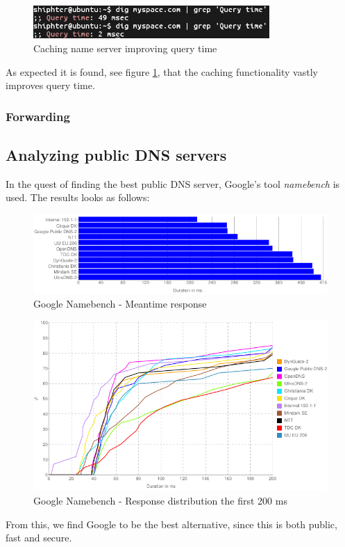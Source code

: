 \begin{figure}[ht!]
\centering
\includegraphics[width=90mm]{img/dig_caching_querytime.png}
\caption{Caching name server improving query time}
\label{dig_caching_querytime}
\end{figure}

As expected it is found, see figure \ref{dig_caching_querytime}, that the caching functionality vastly improves query time.

\subsubsection{Forwarding} 


\subsection{Analyzing public DNS servers}
In the quest of finding the best public DNS server, Google's tool \emph{namebench} is used. The results looks as follows:


\begin{figure}[ht!]
\centering
\includegraphics[width=150mm]{img/namebench_meantime_response_chart.png}
\caption{Google Namebench - Meantime response}
\label{namebench_meantime_response_chart}
\end{figure}

\begin{figure}[ht!]
\centering
\includegraphics[width=150mm]{img/namebench_response_distro.png}
\caption{Google Namebench - Response distribution the first 200 ms}
\label{namebench_response_distro}
\end{figure}

From this, we find Google to be the best alternative, since this is both public, fast and secure.
